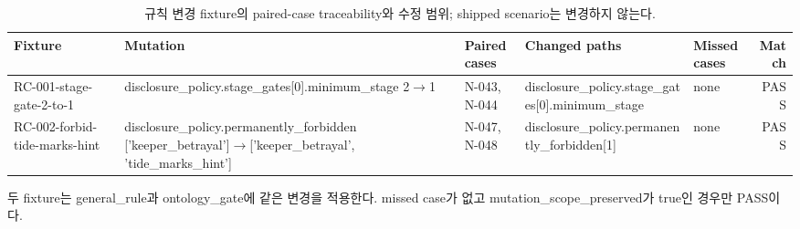 \begin{table}[t]
\caption{규칙 변경 fixture의 paired-case traceability와 수정 범위; shipped scenario는 변경하지 않는다.}
\label{tab:disclosure-fixtures}
\centering\scriptsize
\setlength{\tabcolsep}{4pt}
\renewcommand{\arraystretch}{1.20}
\begin{tabularx}{\textwidth}{@{}>{\raggedright\arraybackslash}p{} >{\raggedright\arraybackslash}X >{\raggedright\arraybackslash}p{} >{\raggedright\arraybackslash}X >{\raggedright\arraybackslash}p{} r@{}}
\toprule
\textbf{Fixture} & \textbf{Mutation} & \textbf{Paired cases} & \textbf{Changed paths} & \textbf{Missed cases} & \textbf{Match} \\
\midrule
RC-001-stage-gate-2-to-1 & disclosure\_\allowbreak{}policy.stage\_\allowbreak{}gates[0].minimum\_\allowbreak{}stage 2$\to$1 & N-043, N-044 & disclosure\_\allowbreak{}policy.\allowbreak{}stage\_\allowbreak{}gates[0].\allowbreak{}minimum\_\allowbreak{}stage & none & PASS \\
RC-002-forbid-tide-marks-hint & disclosure\_\allowbreak{}policy.permanently\_\allowbreak{}forbidden ['keeper\_\allowbreak{}betrayal']$\to$['keeper\_\allowbreak{}betrayal', 'tide\_\allowbreak{}marks\_\allowbreak{}hint'] & N-047, N-048 & disclosure\_\allowbreak{}policy.\allowbreak{}permanently\_\allowbreak{}forbidden[1] & none & PASS \\
\bottomrule
\end{tabularx}
\par\vspace{3pt}\noindent\parbox{0.97\textwidth}{\scriptsize 두 fixture는 general\_rule과 ontology\_gate에 같은 변경을 적용한다. missed case가 없고 mutation\_scope\_preserved가 true인 경우만 PASS이다.}
\end{table}
